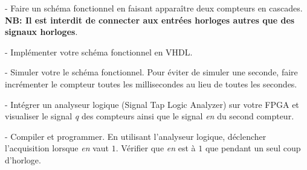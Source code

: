 \medskip

- Faire un schéma fonctionnel en faisant apparaître deux compteurs en cascades. \\ 
\textbf{NB: Il est interdit de connecter aux entrées horloges autres que des signaux horloges}.

\medskip

- Implémenter votre schéma fonctionnel en VHDL.

\medskip

- Simuler votre le schéma fonctionnel. Pour éviter de simuler une seconde, faire incrémenter le compteur toutes les millisecondes au lieu de toutes les secondes.

\medskip

- Intégrer un analyseur logique (Signal Tap Logic Analyzer) sur votre FPGA et visualiser le signal \textit{q} des compteurs ainsi que le signal \textit{en} du second compteur.

\medskip

- Compiler et programmer. En utilisant l'analyseur logique, déclencher l'acquisition lorsque \textit{en} vaut $1$. Vérifier que \textit{en} est à $1$ que pendant un seul coup d'horloge.

